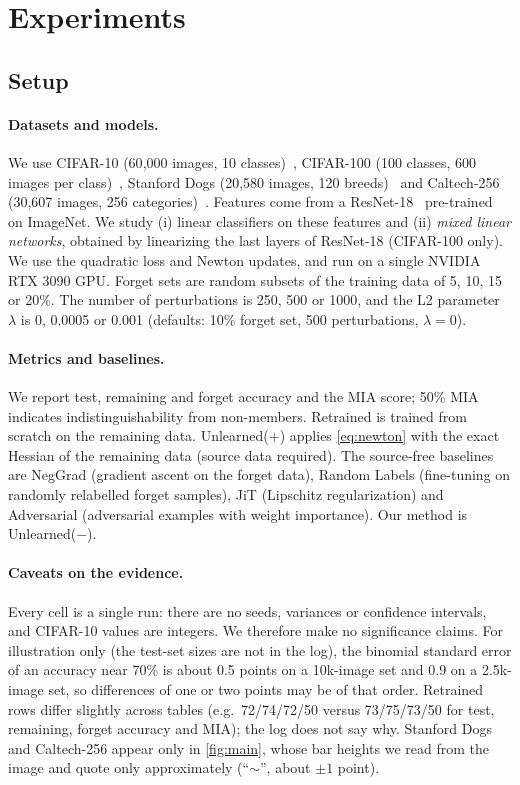 \documentclass[10pt,twocolumn,letterpaper]{article}
\begin{document}
\section{Experiments}
\label{sec:experiments}
\subsection{Setup}
\paragraph{Datasets and models.}
We use CIFAR-10 (60{,}000 images, 10 classes)~\cite{krizhevsky2009learning}, CIFAR-100 (100 classes, 600 images per class)~\cite{krizhevsky2009learning}, Stanford Dogs (20{,}580 images, 120 breeds)~\cite{khosla2011novel} and Caltech-256 (30{,}607 images, 256 categories)~\cite{griffin2007caltech}.
Features come from a ResNet-18~\cite{he2016deep} pre-trained on ImageNet.
We study (i) linear classifiers on these features and (ii) \emph{mixed linear networks}, obtained by linearizing the last layers of ResNet-18 (CIFAR-100 only).
We use the quadratic loss and Newton updates, and run on a single NVIDIA RTX 3090 GPU.
Forget sets are random subsets of the training data of 5, 10, 15 or 20\%.
The number of perturbations is 250, 500 or 1000, and the L2 parameter $\lambda$ is 0, 0.0005 or 0.001 (defaults: 10\% forget set, 500 perturbations, $\lambda=0$).

\paragraph{Metrics and baselines.}
We report test, remaining and forget accuracy and the MIA score; 50\% MIA indicates indistinguishability from non-members.
Retrained is trained from scratch on the remaining data.
Unlearned($+$) applies \cref{eq:newton} with the exact Hessian of the remaining data (source data required).
The source-free baselines are NegGrad (gradient ascent on the forget data), Random Labels (fine-tuning on randomly relabelled forget samples), JiT (Lipschitz regularization) and Adversarial (adversarial examples with weight importance).
Our method is Unlearned($-$).

\paragraph{Caveats on the evidence.}
Every cell is a single run: there are no seeds, variances or confidence intervals, and CIFAR-10 values are integers.
We therefore make no significance claims. For illustration only (the test-set sizes are not in the log), the binomial standard error of an accuracy near 70\% is about 0.5 points on a 10k-image set and 0.9 on a 2.5k-image set, so differences of one or two points may be of that order.
Retrained rows differ slightly across tables (e.g.\ 72/74/72/50 versus 73/75/73/50 for test, remaining, forget accuracy and MIA); the log does not say why.
Stanford Dogs and Caltech-256 appear only in \cref{fig:main}, whose bar heights we read from the image and quote only approximately (``$\sim$'', about $\pm1$ point).
\end{document}
